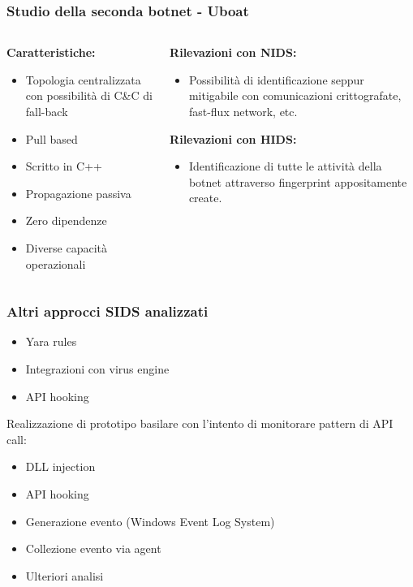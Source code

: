 \begin{frame}
    \frametitle{Studio della seconda botnet - Uboat }
    \begin{columns}[t]
        \begin{column}{0.5\textwidth}
            \textbf{Caratteristiche:}
            \begin{itemize}
                \item Topologia centralizzata con possibilità di C\&C di fall-back
                \item Pull based
                \item Scritto in C++
                \item Propagazione passiva
                \item Zero dipendenze
                \item Diverse capacità operazionali
            \end{itemize}
        \end{column}
        \begin{column}{0.5\textwidth}
            \textbf{Rilevazioni con NIDS:}
            \begin{itemize}
                \item Possibilità di identificazione seppur mitigabile con comunicazioni crittografate, fast-flux network, etc.
            \end{itemize}
            \textbf{Rilevazioni con HIDS:}
            \begin{itemize}
                \item Identificazione di tutte le attività della botnet attraverso fingerprint appositamente create.
            \end{itemize}

        \end{column}
    \end{columns}
\end{frame}

\begin{frame}
    \frametitle{Altri approcci SIDS analizzati}
    \begin{itemize}
        \centering
        \item Yara rules
        \item Integrazioni con virus engine
        \item API hooking
    \end{itemize}

    \medskip

    Realizzazione di prototipo basilare con l'intento di monitorare pattern di API call:
    \begin{itemize}
        \item DLL injection
        \item API hooking
        \item Generazione evento (Windows Event Log System)
        \item Collezione evento via agent
        \item Ulteriori analisi
    \end{itemize}

\end{frame}

